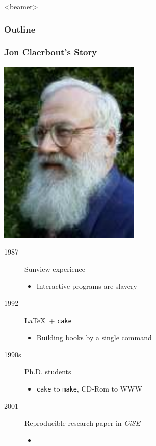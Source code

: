 \begin{frame}<beamer>
  \MadLogo
  \frametitle{Outline}
  \tableofcontents[currentsection]
\end{frame}

\begin{frame}
  \MadLogo
  \frametitle{Jon Claerbout's Story}

  {\flushright
  \includegraphics[height=0.2\textheight]{Fig/Claerbout}
  } 

  \begin{description}
  \item[1987] Sunview experience
  \begin{itemize}
  \item	Interactive programs are slavery
  \end{itemize}
  \item[1992] \LaTeX\ + \texttt{cake}
  \begin{itemize}
  \item Building books by a single command
  \end{itemize}
  \item[1990s] Ph.D. students
  \begin{itemize}
  \item \texttt{cake} to \texttt{make}, CD-Rom to WWW
  \end{itemize}
  \item[2001] Reproducible research paper in \emph{CiSE}
  \begin{itemize}
  \item {\color{blue}{The principal beneficiary is the author}}
  \end{itemize}
  \end{description}
\end{frame}


